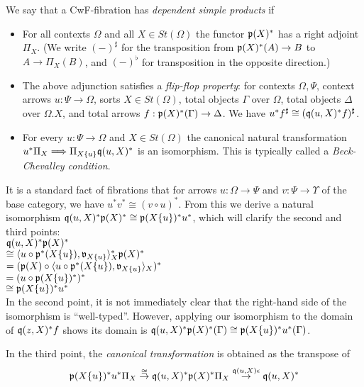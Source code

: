 \documentclass[sigplan,10pt,review,anonymous]{acmart}
\begin{document}
We say that a CwF-fibration has \emph{dependent simple products} if 
\begin{itemize}
\item For all contexts $\Omega$ and all $X \in \mathit{St}(\Omega)$ the functor $\frak p (X)^*$ has a right adjoint $\Pi_{X}$. (We write $(-)^\sharp$ for the transposition from $\frak p(X)^*(A) \to B$ to $A \to \Pi_X(B)$, and $(-)^\flat$ for transposition in the opposite direction.)
\item The above adjunction satisfies a \emph{flip-flop property}: for contexts $\Omega,\Psi$, context arrows $u : \Psi \to \Omega$, sorts $X \in \mathit{St}(\Omega)$, total objects $\Gamma$ over $\Omega$, total objects $\Delta$ over $\Omega . X$, and total arrows $f : \frak p(X)^*(\Gamma) \to \Delta$. We have $u^*f^\sharp \cong (\frak q(u, X)^* f)^\sharp$.
\item For every $u : \Psi \to \Omega$ and $X \in \mathit{St}(\Omega)$ the canonical natural transformation $u^* \Pi_{X} \Longrightarrow \Pi_{X \{ u \}} \frak q(u, X)^*$ is an isomorphism. This is typically called a \emph{Beck-Chevalley condition}.
\end{itemize}

It is a standard fact of fibrations that for arrows $u : \Omega \to \Psi$ and $v : \Psi \to \Upsilon$ of the base category, we have $u^*v^* \cong (v \circ u)^*$. From this we derive a natural isomorphism $\frak q(u,X)^* \frak p(X)^* \cong \frak p(X \{ u \})^* u^*$, which will clarify the second and third points:\\

$\frak q(u,X)^* \frak p(X)^*$\\
$\cong \langle u \circ \frak p^*(X \{ u \}), \frak v_{X \{ u \}} \rangle_X^* \frak p(X)^*$\\
$= (\frak p(X) \circ \langle u \circ \frak p^*(X \{ u \}), \frak v_{X \{ u \}} \rangle_X)^*$\\
$= (u \circ \frak p(X \{ u \})^*)^*$\\
$\cong \frak p(X \{ u \})^* u^*$\\

In the second point, it is not immediately clear that the right-hand side of the isomorphism is ``well-typed''. However, applying our isomorphism to the domain of $\frak q(z, X)^* f$ shows its domain is $\frak q(u,X)^* \frak p(X)^*(\Gamma) \cong \frak p(X \{ u \})^* u^*(\Gamma)$.

In the third point, the \emph{canonical transformation} is obtained as the transpose of
$$\frak p(X \{u \})^* u^* \Pi_X \overset{\cong}{\to} \frak q(u,X)^* \frak p(X)^* \Pi_X \overset{\frak q(u,X) \epsilon}{\to} \frak q(u,X)^*$$
\end{document}
